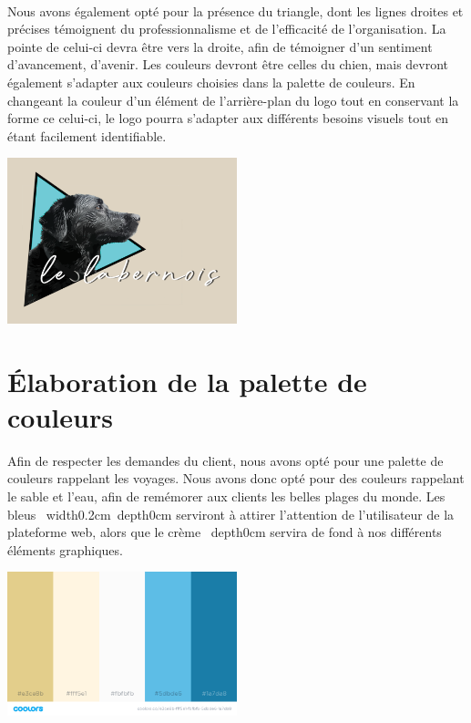 \documentclass{scrreprt}
\begin{document}
\paragraph{}
Nous avons également opté pour la présence du triangle, dont les lignes droites
et précises témoignent du professionnalisme et de l’efficacité de
l’organisation. La pointe de celui-ci devra être vers la droite, afin de
témoigner d’un sentiment d’avancement, d’avenir.
Les couleurs devront être celles du chien, mais devront également s’adapter aux
couleurs choisies dans la palette de couleurs. En changeant la couleur d’un
élément de l’arrière-plan du logo tout en conservant la forme ce celui-ci, le
logo pourra s’adapter aux différents besoins visuels tout en étant facilement
identifiable.\\
\begin{center}
  \includegraphics[width=0.5\textwidth]{images/logo.png}
\end{center}
\section{Élaboration de la palette de couleurs}
Afin de respecter les demandes du client, nous avons opté pour une palette de
couleurs rappelant les voyages. Nous avons donc opté pour des couleurs
rappelant le sable et l’eau, afin de remémorer aux clients les belles plages du
monde. Les bleus \hbox{\vrule height0.2cm
width0.2cm depth0cm} serviront à attirer l’attention de
l’utilisateur de la plateforme web, alors que le crème
\hbox{\vrule height0.2cm width0.2cm
depth0cm} servira de fond à nos différents éléments
graphiques. \\
\begin{center}
  \includegraphics[width=0.5\textwidth]{images/palettev2.png}
\end{center}
\end{document}
